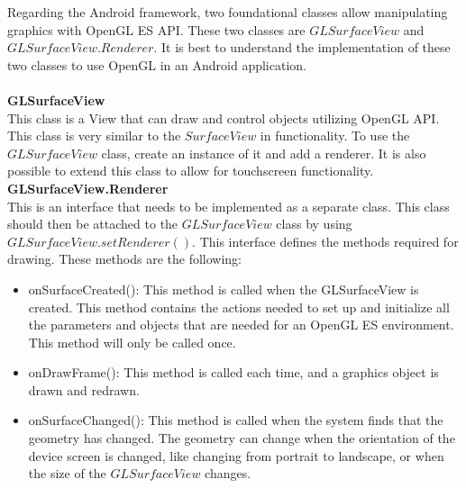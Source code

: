 Regarding the Android framework, two foundational classes allow manipulating graphics with OpenGL ES API. These two classes are $GLSurfaceView$ and $GLSurfaceView.Renderer$. It is best to understand the implementation of these two classes to use OpenGL in an Android application.\cite{androiddevelopers2022}\\
\\
\textbf{GLSurfaceView}\\
This class is a View that can draw and control objects utilizing OpenGL API. This class is very similar to the $SurfaceView$ in functionality. To use the $GLSurfaceView$ class, create an instance of it and add a renderer. It is also possible to extend this class to allow for touchscreen functionality.
\\
\textbf{GLSurfaceView.Renderer}\\
This is an interface that needs to be implemented as a separate class. This class should then be attached to the $GLSurfaceView$ class by using $GLSurfaceView.setRenderer()$. This interface defines the methods required for drawing. These methods are the following:
\begin{itemize}
    \item onSurfaceCreated(): This method is called when the GLSurfaceView is created. This method contains the actions needed to set up and initialize all the parameters and objects that are needed for an OpenGL ES environment. This method will only be called once.
    \item onDrawFrame(): This method is called each time, and a graphics object is drawn and redrawn. 
    \item onSurfaceChanged(): This method is called when the system finds that the geometry has changed. The geometry can change when the orientation of the device screen is changed, like changing from portrait to landscape, or when the size of the $GLSurfaceView$ changes.
\end{itemize}
